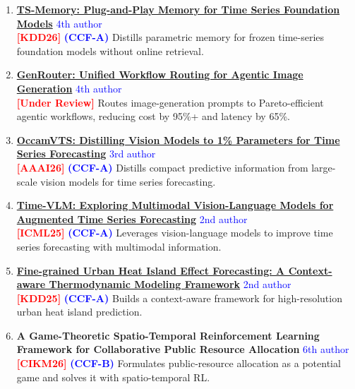\begin{enumerate}
\item \textbf{\href{https://arxiv.org/abs/2602.11550}{TS-Memory: Plug-and-Play Memory for Time Series Foundation Models}}
\hfill \textcolor{blue}{4th author} \\
\textbf{\textcolor{red}{[KDD26]}}
\textbf{\textcolor{blue}{(CCF-A)}}
Distills parametric memory for frozen time-series foundation models without online retrieval.

\item \textbf{\href{https://arxiv.org/abs/2608.16721}{GenRouter: Unified Workflow Routing for Agentic Image Generation}}
\hfill \textcolor{blue}{4th author} \\
\textbf{\textcolor{red}{[Under Review]}}
Routes image-generation prompts to Pareto-efficient agentic workflows, reducing cost by 95\%+ and latency by 65\%.

\item \textbf{\href{https://arxiv.org/abs/2508.01727}{OccamVTS: Distilling Vision Models to 1\% Parameters for Time Series Forecasting}}
\hfill \textcolor{blue}{3rd author} \\
\textbf{\textcolor{red}{[AAAI26]}} 
\textbf{\textcolor{blue}{(CCF-A)}}
Distills compact predictive information from large-scale vision models for time series forecasting.

\item \textbf{\href{https://proceedings.mlr.press/v267/zhong25a.html}{Time-VLM: Exploring Multimodal Vision-Language Models for Augmented Time Series Forecasting}} \hfill \textcolor{blue}{2nd author} \\
\textbf{\textcolor{red}{[ICML25]}} 
\textbf{\textcolor{blue}{(CCF-A)}}
Leverages vision-language models to improve time series forecasting with multimodal information.

\item {\footnotesize \textbf{\href{https://dl.acm.org/doi/abs/10.1145/3711896.3736962}{Fine-grained Urban Heat Island Effect Forecasting: A Context-aware Thermodynamic Modeling Framework}} \hfill \textcolor{blue}{2nd author}} \\
\textbf{\textcolor{red}{[KDD25]}} 
\textbf{\textcolor{blue}{(CCF-A)}}
Builds a context-aware framework for high-resolution urban heat island prediction.

\item {\footnotesize \textbf{A Game-Theoretic Spatio-Temporal Reinforcement Learning Framework for Collaborative Public Resource Allocation} \hfill \textcolor{blue}{6th author}} \\
\textbf{\textcolor{red}{[CIKM26]}}
\textbf{\textcolor{blue}{(CCF-B)}}
Formulates public-resource allocation as a potential game and solves it with spatio-temporal RL.


\end{enumerate}

